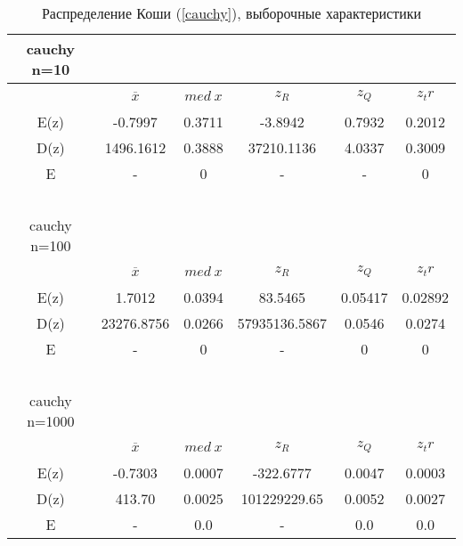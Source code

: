 \documentclass[12pt,a4paper]{article}
\begin{document}
			\begin{table}[h!]
				\label{tabular:cauchy}
				\begin{center}
					\begin{tabular}{|c|c|c|c|c|c|} 
						
						\hline
						cauchy n=10 & \ & \ & \ & \ & \ \\ \hline
						\ & $\overline{x}$ & $med \ x$ & $z_R$ & $z_Q$ & $z_tr$ \\ \hline
						E(z) & -0.7997 & 0.3711 & -3.8942 & 0.7932 & 0.2012 \\ \hline
						D(z) & 1496.1612  & 0.3888 & 37210.1136 &  4.0337  &  0.3009 \\ \hline
						E & - & 0 & - & - & 0\\\hline
						\ & \ & \ & \ & \ & \ \\ \hline
						
						cauchy n=100 & \ & \ & \ & \ & \ \\ \hline
						\ & $\overline{x}$ & $med \ x$  & $z_R$  & $z_Q$  & $z_tr$ \\ \hline
						E(z) & 1.7012 & 0.0394 &  83.5465 & 0.05417 & 0.02892 \\ \hline
						D(z) & 23276.8756   & 0.0266 & 57935136.5867 &  0.0546   &  0.0274 \\ \hline
						E & - & 0 & - & 0 & 0\\\hline
						\ & \ & \ & \ & \ & \ \\ \hline
						
						cauchy n=1000 & \ & \ & \ & \ & \ \\ \hline
						\ & $\overline{x}$ & $med \ x$  & $z_R$  & $z_Q$  & $z_tr$ \\ \hline
						E(z) & -0.7303 & 0.0007 &  -322.6777 & 0.0047 & 0.0003 \\ \hline
						D(z) & 413.70   & 0.0025 & 101229229.65 &  0.0052   &  0.0027 \\ \hline
						E & - & 0.0 & - & 0.0 & 0.0\\\hline
						
					\end{tabular}
				\end{center}
				\caption{Распределение Коши (\ref{cauchy}), выборочные характеристики}
			\end{table}
			
\end{document}
